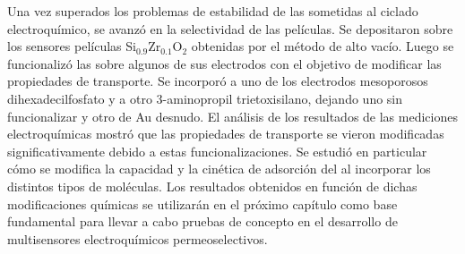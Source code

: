 	Una vez superados los problemas de estabilidad de las \pdm\space sometidas al ciclado electroquímico, se avanzó en la selectividad de las películas. Se depositaron sobre los sensores películas Si$_{0.9}$Zr$_{0.1}$O$_2$ obtenidas por el método de alto vacío. Luego se funcionalizó las \pdm\space sobre algunos de sus electrodos con el objetivo de modificar las propiedades de transporte. Se incorporó a uno de los electrodos mesoporosos dihexadecilfosfato y a otro 3-aminopropil trietoxisilano, dejando uno sin funcionalizar y otro de Au desnudo. El análisis de los resultados de las mediciones electroquímicas mostró que las propiedades de transporte se vieron modificadas significativamente debido a estas funcionalizaciones. Se estudió en particular cómo se modifica la capacidad y la cinética de adsorción del \aminorutenio\space al incorporar los distintos tipos de moléculas. Los resultados obtenidos en función de dichas modificaciones químicas se utilizarán en el próximo capítulo como base fundamental para llevar a cabo pruebas de concepto en el desarrollo de multisensores electroquímicos permeoselectivos.

